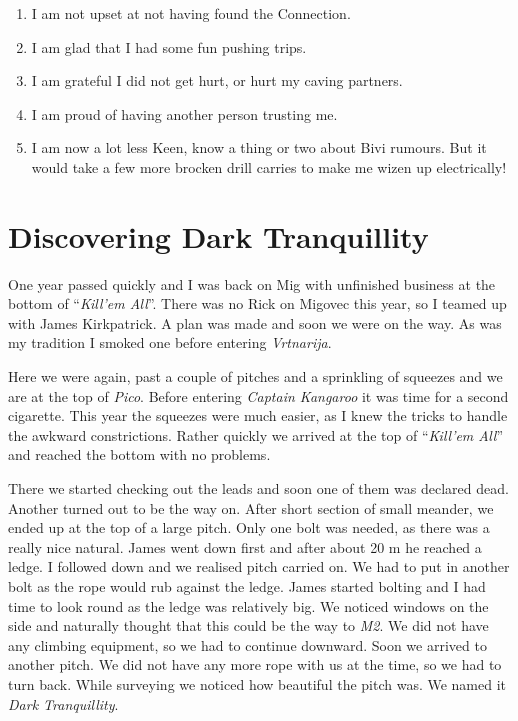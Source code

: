 \begin{enumerate}
\def\labelenumi{\arabic{enumi}.}
\tightlist
\item
  I am not upset at not having found the Connection.
\item
  I am glad that I had some fun pushing trips.
\item
  I am grateful I did not get hurt, or hurt my caving partners.
\item
  I am proud of having another person trusting me.
\item
  I am now a lot less Keen, know a thing or two about Bivi rumours. But
  it would take a few more brocken drill carries to make me wizen up
  electrically!
\end{enumerate}


\hypertarget{discovering-dark-tranquillity}{%
\section{Discovering Dark
Tranquillity}\label{discovering-dark-tranquillity}}

One year passed quickly and I was back on Mig with unfinished business
at the bottom of ``\emph{Kill'em All}''. There was no Rick on Migovec
this year, so I teamed up with James Kirkpatrick. A plan was made and
soon we were on the way. As was my tradition I smoked one before
entering \emph{Vrtnarija}.

Here we were again, past a couple of pitches and a sprinkling of
squeezes and we are at the top of \emph{Pico}. Before entering
\emph{Captain Kangaroo} it was time for a second cigarette. This year
the squeezes were much easier, as I knew the tricks to handle the
awkward constrictions. Rather quickly we arrived at the top of
``\emph{Kill'em All}'' and reached the bottom with no problems.

There we started checking out the leads and soon one of them was
declared dead. Another turned out to be the way on. After short section
of small meander, we ended up at the top of a large pitch. Only one bolt
was needed, as there was a really nice natural. James went down first
and after about 20 m he reached a ledge. I followed down and we realised
pitch carried on. We had to put in another bolt as the rope would rub
against the ledge. James started bolting and I had time to look round as
the ledge was relatively big. We noticed windows on the side and
naturally thought that this could be the way to \emph{M2}. We did not
have any climbing equipment, so we had to continue downward. Soon we
arrived to another pitch. We did not have any more rope with us at the
time, so we had to turn back. While surveying we noticed how beautiful
the pitch was. We named it \emph{Dark Tranquillity}.

